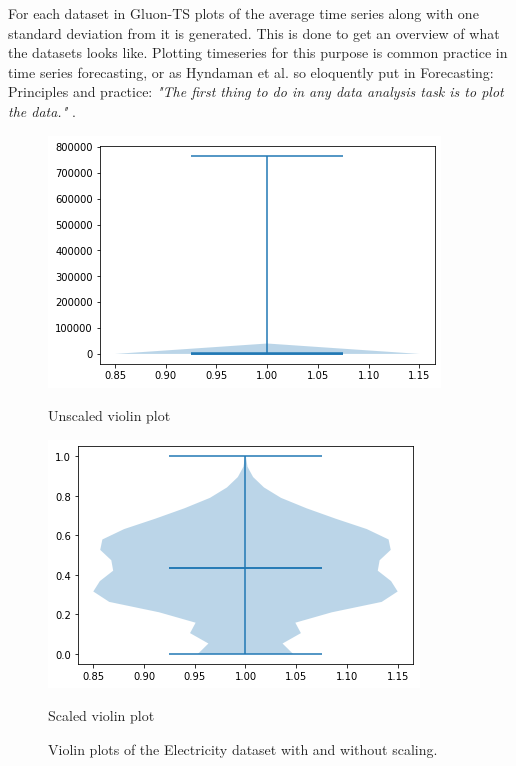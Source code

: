 For each dataset in Gluon-TS plots of the average time series along with one standard deviation from it is generated. This is done to get an overview of what the datasets looks like. Plotting timeseries for this purpose is common practice in time series forecasting, or as Hyndaman et al. so eloquently put in Forecasting: Principles and practice: \textit{"The first thing to do in any data analysis task is to plot the data."} \cite{hyndman_forecasting_3rd}.

\begin{figure}[htb]
  \centering
  \includegraphics[width=\linewidth]{./img/electricity_violin_unscaled.png}
  \caption{Unscaled violin plot}

  \label{fig:electricity_violin_unscaled}
  \endminipage\hfill
  \includegraphics[width=\linewidth]{./img/electricity_violin.png}
  \caption{Scaled violin plot}
  \label{fig:electricity_violin_scaled}
  \endminipage\hfill
  \caption{Violin plots of the Electricity dataset with and without scaling.}
\end{figure}

